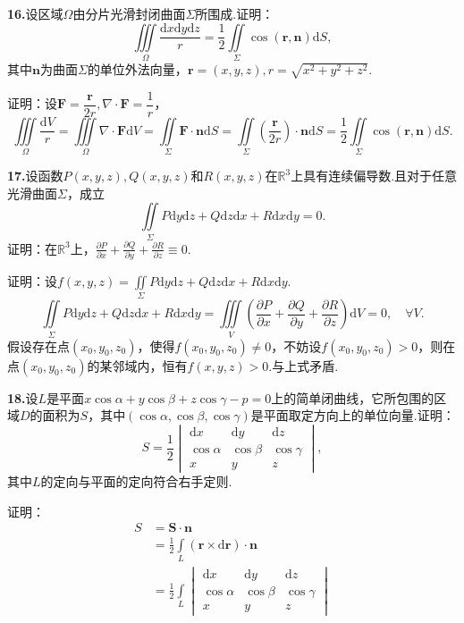 \documentclass[12pt, a4paper]{article}
\newcommand{\RR}{\mathbb{R}}
\newcommand{\dif}{\mathrm{d}}
\begin{document}
\textbf{16.}设区域\(\Omega\)由分片光滑封闭曲面\(\Sigma\)所围成.证明：
\[\iiint\limits_\Omega \frac{\dif x\dif y\dif z}{r} = \frac{1}{2}\iint\limits_\Sigma \cos(\boldsymbol{r}, \boldsymbol{n})\dif S,\]
其中\(\boldsymbol{n}\)为曲面\(\Sigma\)的单位外法向量，\(\boldsymbol{r} = (x, y, z), r = \sqrt{x^2 + y^2 + z^2}\).

证明：设\(\boldsymbol{F} = \dfrac{\boldsymbol{r}}{2r}, \nabla \cdot \boldsymbol{F} = \dfrac{1}{r}\)，
\[\iiint\limits_\Omega \frac{\dif V}{r} = \iiint\limits_\Omega \nabla \cdot \boldsymbol{F}\dif V = \iint\limits_\Sigma \boldsymbol{F} \cdot \boldsymbol{n}\dif S = \iint\limits_\Sigma \left(\frac{\boldsymbol{r}}{2r}\right) \cdot \boldsymbol{n}\dif S = \frac{1}{2}\iint\limits_\Sigma \cos(\boldsymbol{r}, \boldsymbol{n})\dif S.\]

\textbf{17.}设函数\(P(x, y, z), Q(x, y, z)\)和\(R(x, y, z)\)在\(\RR^3\)上具有连续偏导数.且对于任意光滑曲面\(\Sigma\)，成立
\[\iint\limits_\Sigma P\dif y\dif z + Q\dif z\dif x + R\dif x\dif y = 0.\]
证明：在\(\RR^3\)上，\(\frac{\partial P}{\partial x} + \frac{\partial Q}{\partial y} + \frac{\partial R}{\partial z} \equiv 0.\)

证明：设\(f(x, y, z) = \iint\limits_\Sigma P\dif y\dif z + Q\dif z\dif x + R\dif x\dif y\).
\[\iint\limits_\Sigma P\dif y\dif z + Q\dif z\dif x + R\dif x\dif y = \iiint\limits_V \left(\frac{\partial P}{\partial x} + \frac{\partial Q}{\partial y} + \frac{\partial R}{\partial z}\right)\dif V = 0, \quad \forall V.\]
假设存在点\((x_0, y_0, z_0)\)，使得\(f(x_0, y_0, z_0) \neq 0\)，不妨设\(f(x_0, y_0, z_0) > 0\)，则在点\((x_0, y_0, z_0)\)的某邻域内，恒有\(f(x, y, z) > 0\).与上式矛盾.

\textbf{18.}设\(L\)是平面\(x\cos\alpha + y\cos\beta + z\cos\gamma - p = 0\)上的简单闭曲线，它所包围的区域\(D\)的面积为\(S\)，其中\((\cos\alpha, \cos\beta, \cos\gamma)\)是平面取定方向上的单位向量.证明：
\[S = \frac{1}{2}\begin{vmatrix}
\dif x & \dif y & \dif z \\
\cos\alpha & \cos\beta & \cos\gamma \\
x & y & z
\end{vmatrix},\]
其中\(L\)的定向与平面的定向符合右手定则.

证明：
\begin{align*}
S &= \boldsymbol{S} \cdot \boldsymbol{n} \\
&= \frac{1}{2}\int\limits_L (\boldsymbol{r} \times \dif\boldsymbol{r}) \cdot \boldsymbol{n} \\
&= \frac{1}{2}\int\limits_L \begin{vmatrix}
\dif x & \dif y & \dif z \\
\cos\alpha & \cos\beta & \cos\gamma \\
x & y & z
\end{vmatrix}
\end{align*}
\end{document}
